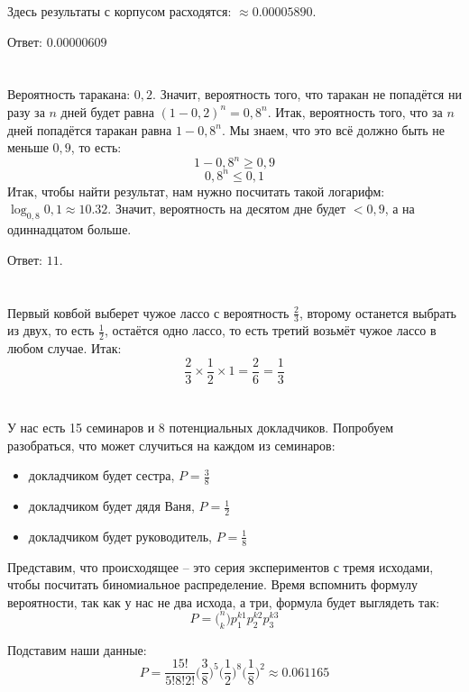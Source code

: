 \documentclass[a4paper,10pt]{article}
\begin{document}
Здесь результаты с корпусом расходятся: $\approx 0.00005890$.

Ответ: $0.00000609$

\section{}
Вероятность таракана: $0,2$. Значит, вероятность того, что таракан не попадётся ни разу за $n$ дней будет равна $(1 - 0,2)^n = 0,8^n$. Итак, вероятность того, что за $n$ дней попадётся таракан равна $1 - 0,8^n$. Мы знаем, что это всё должно быть не меньше $0,9$, то есть:
$$ 1 - 0,8^n \geqslant 0,9$$
$$ 0,8^n \leqslant 0,1 $$
Итак, чтобы найти результат, нам нужно посчитать такой логарифм:
$ \log_{0,8} 0,1 \approx 10.32 $. Значит, вероятность на десятом дне будет $<0,9$,
а на одиннадцатом больше.

Ответ: $11$.

\section{}
Первый ковбой выберет чужое лассо с вероятность $\frac{2}{3}$, второму останется выбрать из двух, то есть $\frac{1}{2}$, остаётся одно лассо, то есть третий возьмёт чужое лассо в любом случае. Итак:
$$ \frac{2}{3} \times \frac{1}{2} \times 1 = \frac{2}{6} = \frac{1}{3} $$

\section{}
У нас есть 15 семинаров и 8 потенциальных докладчиков. Попробуем разобраться, что может случиться на каждом из семинаров:
\begin{itemize}
 \item докладчиком будет сестра, $P = \frac{3}{8}$
 \item докладчиком будет дядя Ваня, $P = \frac{1}{2}$
 \item докладчиком будет руководитель, $P = \frac{1}{8}$
\end{itemize}
Представим, что происходящее -- это серия экспериментов с тремя исходами, чтобы посчитать биномиальное распределение. Время вспомнить формулу вероятности, так как у нас не два исхода, а три, формула будет выглядеть так:
$$ P = \big(^n_k\big) p_1^{k1} p_2^{k2} p_3^{k3} $$

Подставим наши данные:
$$
P = \frac{15!}{5! 8! 2!} \bigg(\frac{3}{8}\bigg)^5
\bigg(\frac{1}{2}\bigg)^8 \bigg(\frac{1}{8}\bigg)^2
\approx 0.061165
$$
\end{document}
